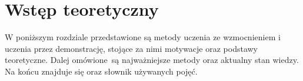 \chapter{Wstęp teoretyczny}
W poniższym rozdziale przedstawione są metody uczenia ze wzmocnieniem i uczenia przez demonstrację, stojące za nimi motywacje oraz podstawy teoretyczne. Dalej omówione są najważniejsze metody oraz aktualny stan wiedzy. Na końcu znajduje się oraz słownik używanych pojęć.

%








